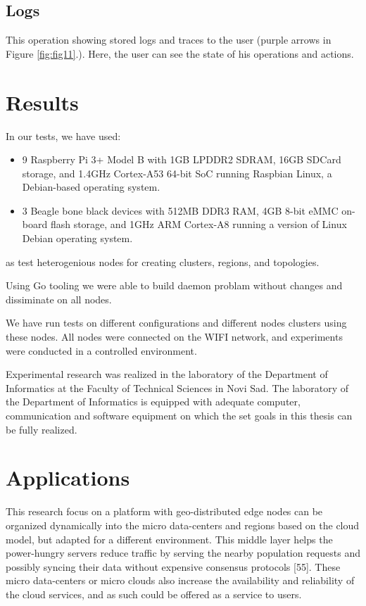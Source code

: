 \subsection{Logs}\label{sec:logs}
% 
This operation showing stored logs and traces to the user (purple arrows in Figure \ref{fig:fig11}.). Here, the user can see the state of his operations and actions.
%
%
\section{Results}\label{sec:results} 
In our tests, we have used:

\begin{itemize}
	\item 9 Raspberry Pi 3+ Model B with 1GB LPDDR2 SDRAM, 16GB SDCard storage, and 1.4GHz Cortex-A53 64-bit SoC running Raspbian Linux, a Debian-based operating system.
	\item 3 Beagle bone black devices with 512MB DDR3 RAM, 4GB 8-bit eMMC on-board flash storage, and 1GHz ARM Cortex-A8 running a version of Linux Debian operating system.
\end{itemize}

\noindent
as test heterogenious nodes for creating clusters, regions, and topologies. 

Using Go tooling we were able to build daemon problam without changes and dissiminate on all nodes.

We have run tests on different configurations and different nodes clusters using these nodes. All nodes were connected on the WIFI network, and experiments were conducted in a controlled environment.

Experimental research was realized in the laboratory of the Department of Informatics at the Faculty of Technical Sciences in Novi Sad. The laboratory of the Department of Informatics is equipped with adequate computer, communication and software equipment on which the set goals in this thesis can be fully realized.
%
%
\section{Applications}\label{sec:app}
%
This research focus on a platform with geo-distributed edge nodes can be organized dynamically into the micro data-centers and regions based on the cloud model, but adapted for a different environment. This middle layer helps the power-hungry servers reduce traffic by serving the nearby population requests and possibly syncing their data without expensive consensus protocols [55]. These micro data-centers or micro clouds also increase the availability and reliability of the cloud services, and as such could be offered as a service to users.

